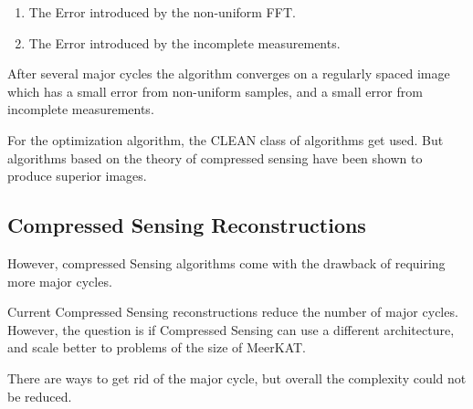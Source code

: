 \begin{enumerate}
	\item The Error introduced by the non-uniform FFT.
	\item The Error introduced by the incomplete measurements.
\end{enumerate}

After several major cycles the algorithm converges on a regularly spaced image which has a small error from non-uniform samples, and a small error from incomplete measurements.

For the optimization algorithm, the CLEAN class of algorithms get used. But algorithms based on the theory of compressed sensing have been shown to produce superior images.


\subsection{Compressed Sensing Reconstructions}
 However, compressed Sensing algorithms come with the drawback of requiring more major cycles.

Current Compressed Sensing reconstructions reduce the number of major cycles. However, the question is if Compressed Sensing can use a different architecture, and scale better to problems of the size of MeerKAT.

There are ways to get rid of the major cycle, but overall the complexity could not be reduced.










